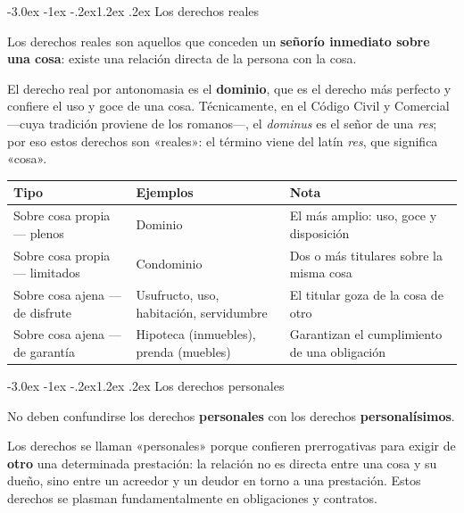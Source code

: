 \documentclass[12pt,oneside]{book}
\makeatletter
\renewcommand\section{\@startsection{section}{1}{\z@}%
  {-3.0ex \@plus -1ex \@minus -.2ex}{1.2ex \@plus .2ex}%
  {\normalfont\large\bfseries\color{acento}}}
\newenvironment{tabla}{%
    \par\medskip\begingroup\small\renewcommand{\arraystretch}{1.3}\noindent\ignorespaces
}{%
    \par\endgroup\medskip
}
\makeatother
\begin{document}
\section{Los derechos reales}

\begin{definicion}
Los derechos reales son aquellos que conceden un \textbf{señorío inmediato sobre una cosa}: existe una relación directa de la persona con la cosa.
\end{definicion}

El derecho real por antonomasia es el \textbf{dominio}, que es el derecho más perfecto y confiere el uso y goce de una cosa. Técnicamente, en el Código Civil y Comercial ---cuya tradición proviene de los romanos---, el \textit{dominus} es el señor de una \textit{res}; por eso estos derechos son «reales»: el término viene del latín \textit{res}, que significa «cosa».

\begin{tabla}
\begin{tabularx}{\textwidth}{B{4.4cm}P{4.2cm}Y}
\toprule
Tipo & \textbf{Ejemplos} & \textbf{Nota} \\
\midrule
Sobre cosa propia --- plenos & Dominio & El más amplio: uso, goce y disposición \\
Sobre cosa propia --- limitados & Condominio & Dos o más titulares sobre la misma cosa \\
Sobre cosa ajena --- de disfrute & Usufructo, uso, habitación, servidumbre & El titular goza de la cosa de otro \\
Sobre cosa ajena --- de garantía & Hipoteca (inmuebles), prenda (muebles) & Garantizan el cumplimiento de una obligación \\
\bottomrule
\end{tabularx}
\end{tabla}

\section{Los derechos personales}

\begin{importante}
No deben confundirse los derechos \textbf{personales} con los derechos \textbf{personalísimos}.
\end{importante}

Los derechos se llaman «personales» porque confieren prerrogativas para exigir de \textbf{otro} una determinada prestación: la relación no es directa entre una cosa y su dueño, sino entre un acreedor y un deudor en torno a una prestación. Estos derechos se plasman fundamentalmente en obligaciones y contratos.
\end{document}
